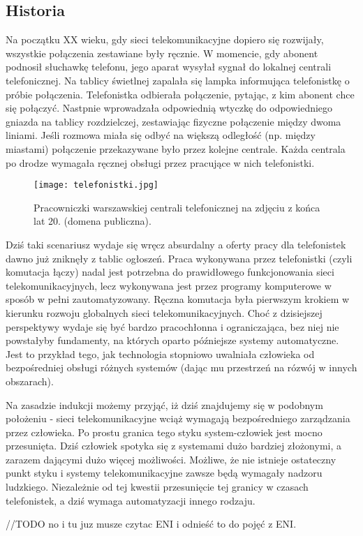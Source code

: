 \subsection{Historia}

Na początku XX wieku, gdy sieci telekomunikacyjne dopiero się rozwijały, wszystkie połączenia zestawiane były ręcznie. W momencie, gdy abonent podnosił słuchawkę telefonu, jego aparat wysyłał sygnał do lokalnej centrali telefonicznej. Na tablicy świetlnej zapalała się lampka informująca telefonistkę o próbie połączenia. Telefonistka odbierała połączenie, pytając, z kim abonent chce się połączyć. Nastpnie wprowadzała odpowiednią wtyczkę do odpowiedniego gniazda na tablicy rozdzielczej, zestawiając fizyczne połączenie między dwoma liniami. Jeśli rozmowa miała się odbyć na większą odległość (np. między miastami) połączenie przekazywane było przez kolejne centrale. Każda centrala po drodze wymagała ręcznej obsługi przez pracujące w nich telefonistki. 

\begin{figure}[!h]
    \centering \texttt{[image: telefonistki.jpg]}
    \caption{Pracowniczki warszawskiej centrali telefonicznej na zdjęciu z końca lat 20. (domena publiczna).}\label{fig:telefonistki}
\end{figure}

Dziś taki scenariusz wydaje się wręcz absurdalny a oferty pracy dla telefonistek dawno już zniknęły z tablic ogłoszeń. Praca wykonywana przez telefonistki (czyli komutacja łączy) nadal jest potrzebna do prawidłowego funkcjonowania sieci telekomunikacyjnych, lecz wykonywana jest przez programy komputerowe w sposób w pełni zautomatyzowany. Ręczna komutacja była pierwszym krokiem w kierunku rozwoju globalnych sieci telekomunikacyjnych. Choć z dzisiejszej perspektywy wydaje się być bardzo pracochłonna i ograniczająca, bez niej nie powstałyby fundamenty, na których oparto późniejsze systemy automatyczne. Jest to przykład tego, jak technologia stopniowo uwalniała człowieka od bezpośredniej obsługi różnych systemów (dając mu przestrzeń na rózwój w innych obszarach). 

Na zasadzie indukcji możemy przyjąć, iż dziś znajdujemy się w podobnym położeniu - sieci telekomunikacyjne wciąż wymagają bezpośredniego zarządzania przez człowieka. Po prostu granica tego styku system-człowiek jest mocno przesunięta. Dziś człowiek spotyka się z systemami dużo bardziej złożonymi, a zarazem dającymi dużo więcej możliwości. Możliwe, że nie istnieje ostateczny punkt styku i systemy telekomunikacyjne zawsze będą wymagały nadzoru ludzkiego. Niezależnie od tej kwestii przesunięcie tej granicy w czasach telefonistek, a dziś wymaga automatyzacji innego rodzaju. 

//TODO no i tu juz musze czytac ENI i odnieść to do pojęć z ENI.